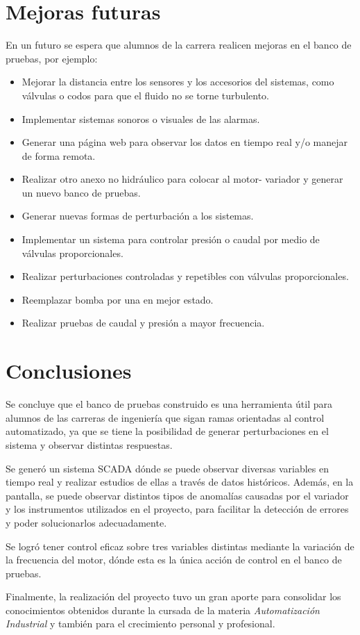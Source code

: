 
\clearpage
\newpage

\section{Mejoras futuras}
En un futuro se espera que alumnos de la carrera realicen mejoras en el banco de pruebas, por ejemplo:
\begin{itemize}
	\item Mejorar la distancia entre los sensores y los accesorios del sistemas, como válvulas o codos para que el fluido no se torne turbulento.
	\item Implementar sistemas sonoros o visuales de las alarmas.
	\item Generar una página web para observar los datos en tiempo real y/o manejar de forma remota.
	\item Realizar otro anexo no hidráulico para colocar al motor- variador y generar un nuevo banco de pruebas.
	\item Generar nuevas formas de perturbación a los sistemas.
	\item Implementar un sistema para controlar presión o caudal por medio de válvulas proporcionales.
	\item Realizar perturbaciones controladas y repetibles con válvulas proporcionales.
	\item Reemplazar bomba por una en mejor estado.
	\item Realizar pruebas de caudal y presión a mayor frecuencia.
\end{itemize}

\newpage
\section{Conclusiones}
Se concluye que el banco de pruebas construido es una herramienta útil para alumnos de las carreras de ingeniería que sigan ramas orientadas al control automatizado, ya que se tiene la posibilidad de generar perturbaciones en el sistema y observar distintas respuestas.

Se generó un sistema SCADA dónde se puede observar diversas variables en tiempo real y realizar estudios de ellas a través de datos históricos. Además, en la pantalla, se puede observar distintos tipos de anomalías causadas por el variador y los instrumentos utilizados en el proyecto, para facilitar la detección de errores y poder solucionarlos adecuadamente.

Se logró tener control eficaz sobre tres variables distintas mediante la variación de la frecuencia del motor, dónde esta es la única acción de control en el banco de pruebas.

Finalmente, la realización del proyecto tuvo un gran aporte para consolidar los conocimientos obtenidos durante la cursada de la materia \textit{Automatización Industrial} y también para el crecimiento personal y profesional.



\newpage
